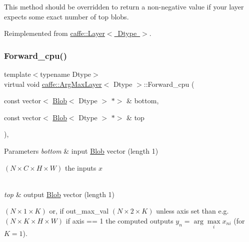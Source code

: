 This method should be overridden to return a non-\/negative value if your layer expects some exact number of top blobs. 

Reimplemented from \mbox{\hyperlink{classcaffe_1_1_layer_a64e2ca72c719e4b2f1f9216ccfb0d37f}{caffe\+::\+Layer$<$ Dtype $>$}}.

\mbox{\label{classcaffe_1_1_arg_max_layer_a5443ad874d389b1ddbb1e363857a049f}} 
\subsubsection{\texorpdfstring{Forward\+\_\+cpu()}{Forward\_cpu()}\hspace{0.1cm}{\footnotesize\ttfamily [1/2]}}
{\footnotesize\ttfamily template$<$typename Dtype$>$ \\
virtual void \mbox{\hyperlink{classcaffe_1_1_arg_max_layer}{caffe\+::\+Arg\+Max\+Layer}}$<$ Dtype $>$\+::Forward\+\_\+cpu (\begin{DoxyParamCaption}\item[{const vector$<$ \mbox{\hyperlink{classcaffe_1_1_blob}{Blob}}$<$ Dtype $>$ $\ast$$>$ \&}]{bottom,  }\item[{const vector$<$ \mbox{\hyperlink{classcaffe_1_1_blob}{Blob}}$<$ Dtype $>$ $\ast$$>$ \&}]{top }\end{DoxyParamCaption})\hspace{0.3cm}{\ttfamily [protected]}, {\ttfamily [virtual]}}


\begin{DoxyParams}{Parameters}
{\em bottom} & input \mbox{\hyperlink{classcaffe_1_1_blob}{Blob}} vector (length 1)
\begin{DoxyEnumerate}
\item $ (N \times C \times H \times W) $ the inputs $ x $ 
\end{DoxyEnumerate}\\
\hline
{\em top} & output \mbox{\hyperlink{classcaffe_1_1_blob}{Blob}} vector (length 1)
\begin{DoxyEnumerate}
\item $ (N \times 1 \times K) $ or, if out\+\_\+max\+\_\+val $ (N \times 2 \times K) $ unless axis set than e.\+g. $ (N \times K \times H \times W) $ if axis == 1 the computed outputs $ y_n = \arg\max\limits_i x_{ni} $ (for $ K = 1 $). 
\end{DoxyEnumerate}\\
\hline
\end{DoxyParams}


